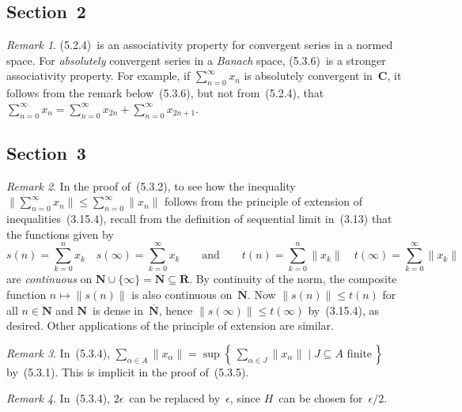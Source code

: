 \documentclass[letterpaper,12pt]{article}
\newcommand{\N}{\mathbf{N}}
\newcommand{\Nex}{\overline{\N}}
\newcommand{\R}{\mathbf{R}}
\newcommand{\Rex}{\overline{\R}}
\newcommand{\C}{\mathbf{C}}
\newcommand{\union}{\cup}
\newcommand{\norm}[1]{\lVert{#1}\rVert}
\theoremstyle{plain}
\theoremstyle{definition}
\theoremstyle{remark}
\newtheorem*{rmk}{Remark}
\begin{document}
\subsection*{Section~2}
\begin{rmk}
(5.2.4)~is an associativity property for convergent series in a normed space. For \emph{absolutely} convergent series in a \emph{Banach} space, (5.3.6)~is a stronger associativity property. For example, if \(\sum_{n=0}^{\infty}x_n\) is absolutely convergent in~\(\C\), it follows from the remark below~(5.3.6), but not from~(5.2.4), that \(\sum_{n=0}^{\infty}x_n=\sum_{n=0}^{\infty}x_{2n}+\sum_{n=0}^{\infty}x_{2n+1}\).
\end{rmk}

\subsection*{Section~3}
\begin{rmk}
In the proof of~(5.3.2), to see how the inequality \(\norm{\sum_{n=0}^{\infty}x_n}\le\sum_{n=0}^{\infty}\norm{x_n}\) follows from the principle of extension of inequalities~(3.15.4), recall from the definition of sequential limit in~(3.13) that the functions given by
\[s(n)=\sum_{k=0}^n x_k\quad s(\infty)=\sum_{k=0}^{\infty}x_k\qquad\text{and}\qquad t(n)=\sum_{k=0}^n\norm{x_k}\quad t(\infty)=\sum_{k=0}^{\infty}\norm{x_k}\]
are \emph{continuous} on \(\N\union\{\infty\}=\Nex\subseteq\Rex\). By continuity of the norm, the composite function \(n\mapsto\norm{s(n)}\) is also continuous on~\(\Nex\). Now \(\norm{s(n)}\le t(n)\) for all \(n\in\N\) and \(\N\)~is dense in~\(\Nex\), hence \(\norm{s(\infty)}\le t(\infty)\) by~(3.15.4), as desired. Other applications of the principle of extension are similar.
\end{rmk}

\begin{rmk}
In~(5.3.4), \(\sum_{\alpha\in A}\norm{x_{\alpha}}=\sup\left\{\,\sum_{\alpha\in J}\norm{x_{\alpha}}\mid J\subseteq A\text{ finite}\,\right\}\) by~(5.3.1). This is implicit in the proof of~(5.3.5).
\end{rmk}

\begin{rmk}
In~(5.3.4), \(2\epsilon\)~can be replaced by~\(\epsilon\), since \(H\)~can be chosen for~\(\epsilon/2\).
\end{rmk}
\end{document}
